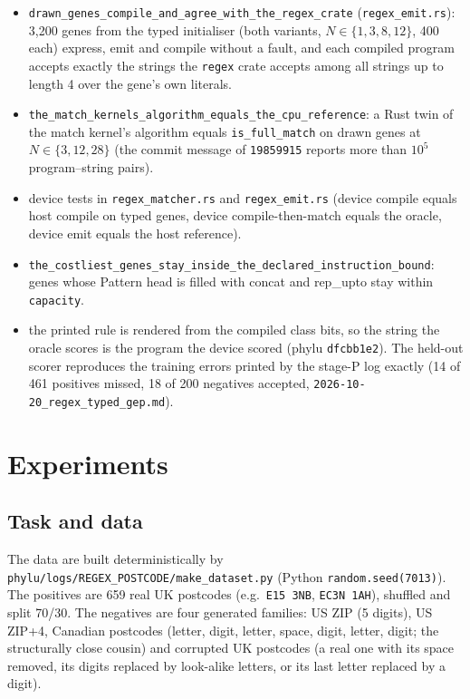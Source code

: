 \documentclass[sigconf,nonacm]{acmart}
\newcommand{\ty}[1]{\textsf{#1}}
\newcommand{\sym}[1]{\textsf{#1}}
\newcommand{\src}[1]{{\small\nolinkurl{#1}}}
\begin{document}
\begin{itemize}
\item \src{drawn_genes_compile_and_agree_with_the_regex_crate}
(\src{regex_emit.rs}): 3{,}200 genes from the typed initialiser (both
variants, $N\in\{1,3,8,12\}$, 400 each) express, emit and compile without a
fault, and each compiled program accepts exactly the strings the \texttt{regex}
crate accepts among all strings up to length 4 over the gene's own literals.
\item \src{the_match_kernels_algorithm_equals_the_cpu_reference}: a Rust
twin of the match kernel's algorithm equals \src{is_full_match} on drawn
genes at $N\in\{3,12,28\}$ (the commit message of \texttt{19859915} reports more
than $10^5$ program--string pairs).
\item device tests in \src{regex_matcher.rs} and \src{regex_emit.rs}
(device compile equals host compile on typed genes, device compile-then-match
equals the oracle, device emit equals the host reference).
\item \src{the_costliest_genes_stay_inside_the_declared_instruction_bound}:
genes whose \ty{Pattern} head is filled with \sym{concat} and \sym{rep\_upto} stay
within \texttt{capacity}.
\item the printed rule is rendered from the compiled class bits, so the string
the oracle scores is the program the device scored (phylu \texttt{dfcbb1e2}). The
held-out scorer reproduces the training errors printed by the stage-P log
exactly (14 of 461 positives missed, 18 of 200 negatives accepted,
\src{2026-10-20_regex_typed_gep.md}).
\end{itemize}

\section{Experiments}
\label{sec:experiments}

\subsection{Task and data}

The data are built deterministically by
\src{phylu/logs/REGEX_POSTCODE/make_dataset.py} (Python \texttt{random.seed(7013)}).
The positives are 659 real UK postcodes (e.g.\ \texttt{E15 3NB},
\texttt{EC3N 1AH}), shuffled and split 70/30. The negatives are four generated
families: US ZIP (5 digits), US ZIP+4, Canadian postcodes (letter, digit,
letter, space, digit, letter, digit; the structurally close cousin) and corrupted
UK postcodes (a real one with its space removed, its digits replaced by
look-alike letters, or its last letter replaced by a digit).
\end{document}
